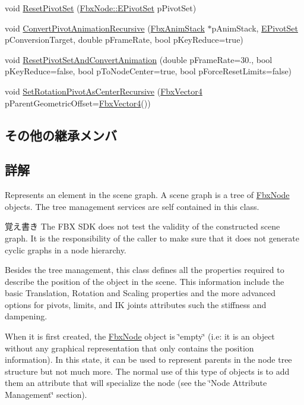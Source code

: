 \begin{DoxyCompactItemize}
\item 
void \hyperlink{class_fbx_node_a19800e7793c5c297efc143f50554b739}{Reset\+Pivot\+Set} (\hyperlink{class_fbx_node_ae62b7311ac4727654cdf1ebd5cbf7343}{Fbx\+Node\+::\+E\+Pivot\+Set} p\+Pivot\+Set)
\item 
void \hyperlink{class_fbx_node_a175cffa28c7d85de8cb976599060b68a}{Convert\+Pivot\+Animation\+Recursive} (\hyperlink{class_fbx_anim_stack}{Fbx\+Anim\+Stack} $\ast$p\+Anim\+Stack, \hyperlink{class_fbx_node_ae62b7311ac4727654cdf1ebd5cbf7343}{E\+Pivot\+Set} p\+Conversion\+Target, double p\+Frame\+Rate, bool p\+Key\+Reduce=true)
\item 
void \hyperlink{class_fbx_node_a0cebcf83a120fdb1c56c7f99cf9cf602}{Reset\+Pivot\+Set\+And\+Convert\+Animation} (double p\+Frame\+Rate=30., bool p\+Key\+Reduce=false, bool p\+To\+Node\+Center=true, bool p\+Force\+Reset\+Limits=false)
\item 
void \hyperlink{class_fbx_node_a011db7d98b19fca54f6b9d8c97d251c5}{Set\+Rotation\+Pivot\+As\+Center\+Recursive} (\hyperlink{class_fbx_vector4}{Fbx\+Vector4} p\+Parent\+Geometric\+Offset=\hyperlink{class_fbx_vector4}{Fbx\+Vector4}())
\end{DoxyCompactItemize}
\subsection*{その他の継承メンバ}


\subsection{詳解}
Represents an element in the scene graph. A scene graph is a tree of \hyperlink{class_fbx_node}{Fbx\+Node} objects. The tree management services are self contained in this class.

\begin{DoxyNote}{覚え書き}
The F\+BX S\+DK does not test the validity of the constructed scene graph. It is the responsibility of the caller to make sure that it does not generate cyclic graphs in a node hierarchy.
\end{DoxyNote}
Besides the tree management, this class defines all the properties required to describe the position of the object in the scene. This information include the basic Translation, Rotation and Scaling properties and the more advanced options for pivots, limits, and IK joints attributes such the stiffness and dampening.

When it is first created, the \hyperlink{class_fbx_node}{Fbx\+Node} object is \char`\"{}empty\char`\"{} (i.\+e\+: it is an object without any graphical representation that only contains the position information). In this state, it can be used to represent parents in the node tree structure but not much more. The normal use of this type of objects is to add them an attribute that will specialize the node (see the \char`\"{}\+Node Attribute Management\char`\"{} section).


